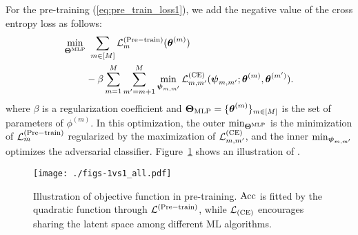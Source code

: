 For the pre-training (\ref{eq:pre_train_loss1}), we add the negative value of the cross entropy loss as follows:
\begin{align}
 \min_{ \boldsymbol{\Theta}^{\rm MLP} } & \
 \sum_{m \in [M]} {\mathcal L}_m^{\rm (Pre-train)}(\boldsymbol{\theta}^{(m)}) \notag\\
 & - \beta 
 \sum_{m = 1}^M \sum_{m^\prime = m+1}^M 
 \min_{ \boldsymbol{\psi}_{m,m^\prime} } 
 {\mathcal L}_{m,m^\prime}^{\rm (CE)}(\boldsymbol{\psi}_{m,m^\prime} ; \boldsymbol{\theta}^{(m)}, \boldsymbol{\theta}^{(m^\prime)}). 
 \label{eq:pre-train_loss}
\end{align}
where $\beta$ is a regularization coefficient and 
$\boldsymbol{\Theta}_{\rm MLP} = \{ \boldsymbol{\theta}^{(m)} \}_{m \in [M]}$ 
is the set of parameters of $\phi^{(m)}$.
%
In this optimization, 
the outer 
$\min_{ \boldsymbol{\Theta}^{\rm MLP} }$
is the minimization of
${\mathcal L}_m^{\rm (Pre-train)}$ 
regularized by the maximization of
${\mathcal L}_{m,m^\prime}^{\rm (CE)}$, 
and the inner 
$\min_{ \boldsymbol{\psi}_{m,m^\prime} }$
optimizes the adversarial classifier.
%
Figure~\ref{fig:pre-train_learning} shows an illustration of \eq{eq:pre-train_loss}.


\begin{figure}[t]
  \centering
  \texttt{[image: ./figs-1vs1\_all.pdf]}
 \caption{
 Illustration of objective function in pre-training.
 $\mathrm{Acc}$ is fitted by the quadratic function through 
 ${\mathcal L}^{(\mathrm{Pre-train})}$, 
 while ${\mathcal L}_{(\mathrm{CE})}$ encourages sharing the latent space among different ML algorithms.
 }
  \label{fig:pre-train_learning}
\end{figure}

